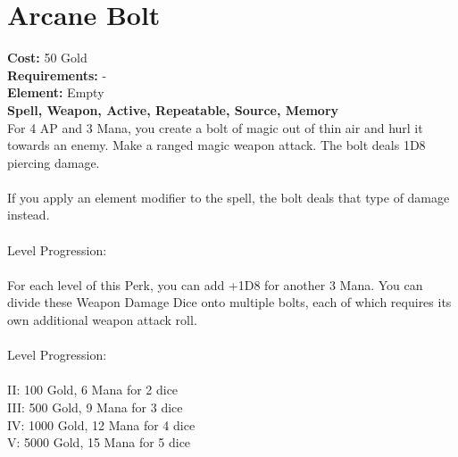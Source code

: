 \section{Arcane Bolt}
\textbf{Cost:} 50 Gold\\
\textbf{Requirements:} -\\
\textbf{Element:} Empty\\
\textbf{Spell, Weapon, Active, Repeatable, Source, Memory}\\
For 4 AP and 3 Mana, you create a bolt of magic out of thin air and hurl it towards an enemy. Make a ranged magic weapon attack. The bolt deals 1D8 piercing damage.\\
\\
If you apply an element modifier to the spell, the bolt deals that type of damage instead.\\
\\
Level Progression:\\
\\
For each level of this Perk, you can add +1D8 for another 3 Mana. You can divide these Weapon Damage Dice onto multiple bolts, each of which requires its own additional weapon attack roll.\\
\\
Level Progression:\\
\\
II: 100 Gold, 6 Mana for 2 dice\\
III: 500 Gold, 9 Mana for 3 dice\\
IV: 1000 Gold, 12 Mana for 4 dice\\
V: 5000 Gold, 15 Mana for 5 dice\\